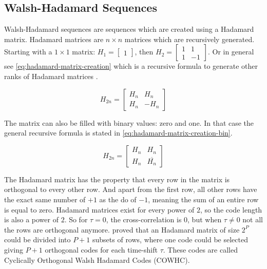 	\subsection{Walsh-Hadamard Sequences}

		Walsh-Hadamard sequences are sequences which are created using a Hadamard matrix.
		Hadamard matrices are $n \times n$ matrices which are recursively generated.
		Starting with a $1 \times 1$ matrix: 
		$H_{1} = \begin{bmatrix} 1 \end{bmatrix}$, then 
		$H_{2} = \begin{bmatrix} 1 & 1 \\ 1 & -1 \end{bmatrix}$.
		Or in general see \autoref{eq:hadamard-matrix-creation} which is a recursive formula to generate other ranks of Hadamard matrices \cite{714616}.

		\begin{equation}
			H_{2n} = 
			\begin{bmatrix} 
				H_n & H_n \\ 
				H_n & -H_n 
			\end{bmatrix}
			\label{eq:hadamard-matrix-creation}
		\end{equation}
		 
		The matrix can also be filled with binary values: zero and one. In that case the general recursive formula is stated in \autoref{eq:hadamard-matrix-creation-bin}. 

		\begin{equation}
			H_{2n} = 
			\begin{bmatrix} 
				H_n & H_n \\ 
				H_n & \overline{H_n}
			\end{bmatrix}
			\label{eq:hadamard-matrix-creation-bin}
		\end{equation}

		The Hadamard matrix has the property that every row in the matrix is orthogonal to every other row.
		And apart from the first row, all other rows have the exact same number of $+1$ as the do of $-1$, meaning the sum of an entire row is equal to zero.
		Hadamard matrices exist for every power of $2$, so the code length is also a power of $2$.
		So for $\tau = 0$, the cross-correlation is $0$, but when $\tau \neq 0$ not all the rows are orthogonal anymore.
		\cite{1182447} proved that an Hadamard matrix of size $2^P$ could be divided into $P + 1$ subsets of rows, where one code could be selected giving $P + 1$ orthogonal codes for each time-shift $\tau$.
		These codes are called Cyclically Orthogonal Walsh Hadamard Codes (COWHC).

